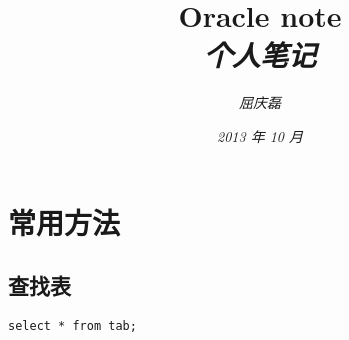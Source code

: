 \documentclass{article}
\begin{document}
\title{
  {\huge \textsf{Oracle note}\\\smallskip}
  {\small \textit{个人笔记}}
}

\author{\textit{屈庆磊}\\[2mm]
       }

\date{\textit{2013 年 10 月}}

\maketitle
\begin{multicols}{2}
\tableofcontents
\end{multicols}

\section{常用方法}
\subsection{查找表}
\begin{verbatim}
select * from tab;
\end{verbatim}
\end{document}
